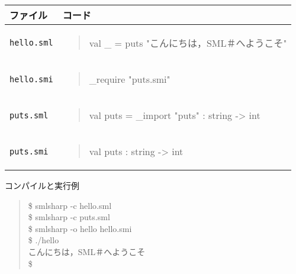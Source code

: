 \documentclass{jbook}
\newcommand{\code}[1]{\mbox{\large\tt #1}}
\newenvironment{program}{\begin{quote}\begin{tt}}%
                        {\end{tt}\end{quote}}
\begin{document}
\begin{itemize}
\begin{tabular}{|l|l|}
\hline
ファイル & コード
\\\hline
\hline
\begin{minipage}{0.5\textwidth}
\code{hello.sml}
\end{minipage}
&
\begin{minipage}{0.5\textwidth}
\begin{program}
val \_ = puts "こんにちは，SML＃へようこそ"
\end{program}
\end{minipage}
\\\hline
\begin{minipage}{0.5\textwidth}
\code{hello.smi}
\end{minipage}
&
\begin{minipage}{0.5\textwidth}
\begin{program}
\_require "puts.smi"
\end{program}
\end{minipage}
\\\hline
\begin{minipage}{0.5\textwidth}
\code{puts.sml}
\end{minipage}
&
\begin{minipage}{0.5\textwidth}
\begin{program}
val puts = \_import "puts" : string -> int
\end{program}
\end{minipage}
\\\hline
\begin{minipage}{0.5\textwidth}
\code{puts.smi}
\end{minipage}
&
\begin{minipage}{0.5\textwidth}
\begin{program}
val puts : string -> int
\end{program}
\end{minipage}
\\\hline
\end{tabular}

コンパイルと実行例
\begin{program}
 \$ smlsharp -c hello.sml\\
 \$ smlsharp -c puts.sml\\
 \$ smlsharp -o hello hello.smi\\
 \$ ./hello\\
 こんにちは，SML＃へようこそ\\
 \$
\end{program}
\end{itemize}
\end{document}
